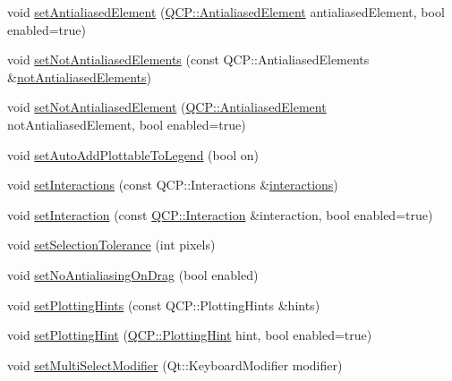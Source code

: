 \begin{DoxyCompactItemize}
void \mbox{\hyperlink{class_q_custom_plot_aeef813bcf7efab8e765f9f87ec454691}{set\+Antialiased\+Element}} (\mbox{\hyperlink{namespace_q_c_p_ae55dbe315d41fe80f29ba88100843a0c}{Q\+C\+P\+::\+Antialiased\+Element}} antialiased\+Element, bool enabled=true)
\item 
void \mbox{\hyperlink{class_q_custom_plot_ae10d685b5eabea2999fb8775ca173c24}{set\+Not\+Antialiased\+Elements}} (const Q\+C\+P\+::\+Antialiased\+Elements \&\mbox{\hyperlink{class_q_custom_plot_a75571bc5b2167e83def132fc993091b3}{not\+Antialiased\+Elements}})
\item 
void \mbox{\hyperlink{class_q_custom_plot_afc657938a707c890e449ae89203a076d}{set\+Not\+Antialiased\+Element}} (\mbox{\hyperlink{namespace_q_c_p_ae55dbe315d41fe80f29ba88100843a0c}{Q\+C\+P\+::\+Antialiased\+Element}} not\+Antialiased\+Element, bool enabled=true)
\item 
void \mbox{\hyperlink{class_q_custom_plot_ad8858410c2db47b7104040a3aa61c3fc}{set\+Auto\+Add\+Plottable\+To\+Legend}} (bool on)
\item 
void \mbox{\hyperlink{class_q_custom_plot_a5ee1e2f6ae27419deca53e75907c27e5}{set\+Interactions}} (const Q\+C\+P\+::\+Interactions \&\mbox{\hyperlink{class_q_custom_plot_a2c78c5fd2943c148ab76652801d3f2dc}{interactions}})
\item 
void \mbox{\hyperlink{class_q_custom_plot_a422bf1bc6d56dac75a3d805d9a65902c}{set\+Interaction}} (const \mbox{\hyperlink{namespace_q_c_p_a2ad6bb6281c7c2d593d4277b44c2b037}{Q\+C\+P\+::\+Interaction}} \&interaction, bool enabled=true)
\item 
void \mbox{\hyperlink{class_q_custom_plot_a4dc31241d7b09680950e19e5f971ed93}{set\+Selection\+Tolerance}} (int pixels)
\item 
void \mbox{\hyperlink{class_q_custom_plot_a775bdcb6329d44701aeaa6135b0e5265}{set\+No\+Antialiasing\+On\+Drag}} (bool enabled)
\item 
void \mbox{\hyperlink{class_q_custom_plot_a94a33cbdadbbac5934843508bcfc210d}{set\+Plotting\+Hints}} (const Q\+C\+P\+::\+Plotting\+Hints \&hints)
\item 
void \mbox{\hyperlink{class_q_custom_plot_a3b7c97bb6c16464e9e15190c07abe9a9}{set\+Plotting\+Hint}} (\mbox{\hyperlink{namespace_q_c_p_a5400e5fcb9528d92002ddb938c1f4ef4}{Q\+C\+P\+::\+Plotting\+Hint}} hint, bool enabled=true)
\item 
void \mbox{\hyperlink{class_q_custom_plot_a8fc96e3b5138a06759a2a90c166df516}{set\+Multi\+Select\+Modifier}} (Qt\+::\+Keyboard\+Modifier modifier)
\item 

\end{DoxyCompactItemize}
